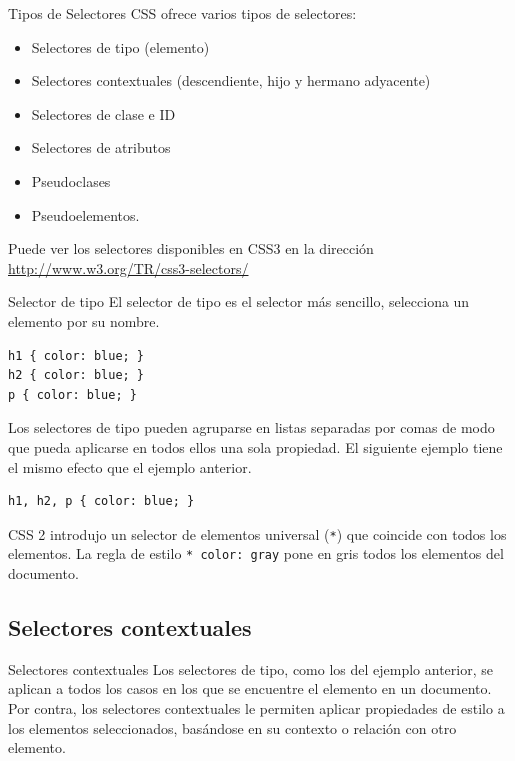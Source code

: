 \begin{frame}{Tipos de Selectores} %
    CSS ofrece varios tipos de selectores: 

    \begin{itemize}
        \item Selectores de tipo (elemento)
        \item Selectores contextuales (descendiente, hijo y hermano adyacente)
        \item Selectores de clase e ID 
        \item Selectores de atributos
        \item Pseudoclases
        \item Pseudoelementos.
    \end{itemize}

    Puede ver los selectores disponibles en CSS3 en la dirección
    \url{http://www.w3.org/TR/css3-selectors/}
\end{frame}

\begin{frame}[fragile]{Selector de tipo} %
    El selector de tipo es el selector más sencillo, selecciona un elemento por
    su nombre. 
\begin{lstlisting}
h1 { color: blue; }
h2 { color: blue; }
p { color: blue; }
\end{lstlisting}

    Los selectores de tipo pueden agruparse en listas separadas por comas de
    modo que pueda aplicarse en todos ellos una sola propiedad. El siguiente
    ejemplo tiene el mismo efecto que el ejemplo anterior. 
\begin{lstlisting}
h1, h2, p { color: blue; }
\end{lstlisting}

    CSS 2 introdujo un selector de elementos universal (\texttt{*}) que
    coincide con todos los elementos. La regla de estilo  \texttt{* {color:
    gray}} pone en gris todos los elementos del documento. 
\end{frame}

\subsection{Selectores contextuales} %


\begin{frame}[fragile]{Selectores contextuales} %
    Los selectores de tipo, como los del ejemplo anterior,  se aplican a todos
    los casos en los que se encuentre el elemento en un documento. Por contra,
    los selectores contextuales le permiten aplicar propiedades de estilo  a
    los elementos seleccionados, basándose en su contexto o relación con otro
    elemento. 
\end{frame}

